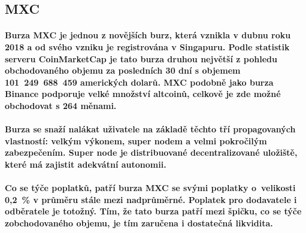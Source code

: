 \documentclass[thesis=B,czech]{FITthesis}[2019/03/21]
\begin{document}
\subsection{MXC}
\paragraph{
Burza MXC je jednou z novějších burz, která vznikla v dubnu roku 2018 a od svého vzniku je registrována v Singapuru. Podle statistik serveru CoinMarketCap je tato burza druhou největší z pohledu obchodovaného objemu za posledních 30 dní s objemem 101~249~688~459 amerických dolarů. \cite{coinmarketcap} MXC podobně jako burza Binance podporuje velké množství altcoinů, celkově je zde možné obchodovat s 264 měnami. \cite{mxc_coins}
}
\paragraph{
Burza se snaží nalákat uživatele na základě těchto tří propagovaných vlastností: velkým výkonem, super nodem a velmi pokročilým zabezpečením. Super node je distribuované decentralizované uložiště, které má zajistit adekvátní autonomii.
}
\paragraph{
Co se týče poplatků, patří burza MXC se svými poplatky o~velikosti 0,2~\% v průměru stále mezi nadprůměrné. Poplatek pro dodavatele i odběratele je totožný. Tím, že tato burza patří mezi špičku, co se týče zobchodovaného objemu, je tím zaručena i dostatečná likvidita. \cite{cryptowisser_mxc} 
}
\end{document}
